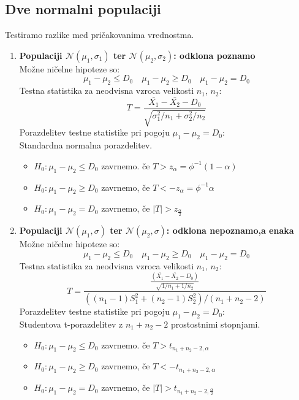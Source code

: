 \documentclass[11pt]{article}
\begin{document}
\subsection{Dve normalni populaciji}
	Testiramo razlike med pričakovanima vrednostma.
	\begin{enumerate}
		\item \textbf{Populaciji $\mathcal{N}(\mu_1,\sigma_1)$ ter $\mathcal{N}(\mu_2,\sigma_2)$: odklona poznamo}
		\\
		Možne ničelne hipoteze so:
		$$\mu_1 - \mu_2 \le D_0 \quad \mu_1 - \mu_2 \ge D_0 \quad \mu_1 - \mu_2 = D_0$$
		Testna statistika za neodvisna vzroca velikosti $n_1$, $n_2$:
		$$T = \frac{\bar{X_1} - \bar{X_2} - D_0}{\sqrt{\sigma_1^2/n_1 + \sigma_2^2/n_2}}$$
		Porazdelitev testne statistike pri pogoju $\mu_1 - \mu_2 = D_0$:
		\\
		Standardna normalna porazdelitev.
		\begin{framed}
		\begin{itemize}
			\item  $H_0 :\mu_1 - \mu_2 \le D_0$ zavrnemo. če $T> z_\alpha = \phi^{-1}(1-\alpha)$
			\item
			$H_0: \mu_1 - \mu_2 \ge D_0$ zavrnemo, če $T< -z_\alpha =\phi^{-1}{\alpha}$   
			\item
			$H_0: \mu_1 -\mu_2 = D_0$ zavrnemo, če $|T| > z_{\frac{\alpha}{2}}$
		\end{itemize}
		\end{framed}
\pagebreak

		\item \textbf{Populaciji $\mathcal{N}(\mu_1,\sigma)$ ter $\mathcal{N}(\mu_2,\sigma)$: odklona nepoznamo,a enaka}
		\\	
		Možne ničelne hipoteze so:
		$$\mu_1 - \mu_2 \le D_0 \quad \mu_1 - \mu_2 \ge D_0 \quad \mu_1 - \mu_2 = D_0$$
		Testna statistika za neodvisna vzroca velikosti $n_1$, $n_2$:
		$$T = \frac{\frac{(\bar{X_1} - \bar{X_2} - D_0)}{\sqrt{1/n_1 + 1/n_2}}}{\left((n_1 -1)S_1^2 +(n_2 - 1)S_2^2\right)/(n_1 +n_2 -2)}$$
		Porazdelitev testne statistike pri pogoju $\mu_1 - \mu_2 = D_0$:
		\\
		Studentova t-porazdelitev z $n_1+n_2 -2$ prostostnimi stopnjami.	
		\begin{framed}
			\begin{itemize}
				\item  $H_0 :\mu_1 - \mu_2 \le D_0$ zavrnemo. če $T> t_{n_1+n_2 -2,\alpha}$
				\item
				$H_0: \mu_1 - \mu_2 \ge D_0$ zavrnemo, če $T< -t_{n_1+n_2 -2,\alpha}$   
				\item
				$H_0: \mu_1 -\mu_2 = D_0$ zavrnemo, če $|T| > t_{n_1+n_2-2, \frac{\alpha}{2}}$
			\end{itemize}
		\end{framed}
\end{enumerate}
	
\end{document}
